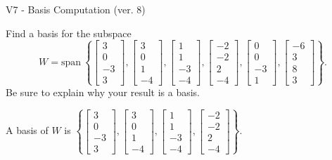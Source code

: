 \begin{exercise}
  \begin{exerciseTitle}V7 - Basis Computation (ver. 8)\end{exerciseTitle}
  \begin{exerciseStatement}
    Find a basis for the subspace 
\[W=\mathrm{span}\ \left\{\left[\begin{array}{r}
3 \\
0 \\
-3 \\
3
\end{array}\right] , \left[\begin{array}{r}
3 \\
0 \\
1 \\
-4
\end{array}\right] , \left[\begin{array}{r}
1 \\
1 \\
-3 \\
-4
\end{array}\right] , \left[\begin{array}{r}
-2 \\
-2 \\
2 \\
-4
\end{array}\right] , \left[\begin{array}{r}
0 \\
0 \\
-3 \\
1
\end{array}\right] , \left[\begin{array}{r}
-6 \\
3 \\
8 \\
3
\end{array}\right]\right\}.\]
 Be sure to explain why your result is a basis.


  \end{exerciseStatement}
  \begin{exerciseAnswer}
   A basis of \(W\) is  \(\left\{\left[\begin{array}{r}
3 \\
0 \\
-3 \\
3
\end{array}\right] , \left[\begin{array}{r}
3 \\
0 \\
1 \\
-4
\end{array}\right] , \left[\begin{array}{r}
1 \\
1 \\
-3 \\
-4
\end{array}\right] , \left[\begin{array}{r}
-2 \\
-2 \\
2 \\
-4
\end{array}\right]\right\}\).
  


  \end{exerciseAnswer}
\end{exercise}
